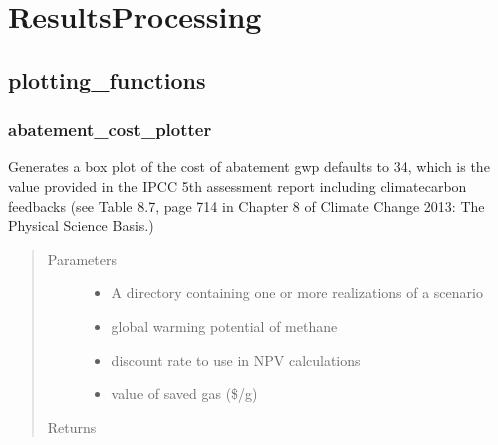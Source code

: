 \documentclass[letterpaper,10pt,english]{sphinxmanual}
\begin{document}
\section{ResultsProcessing}
\label{\detokenize{index:resultsprocessing}}

\subsection{plotting\_functions}
\label{\detokenize{index:module-feast.ResultsProcessing.plotting_functions}}\label{\detokenize{index:plotting-functions}}

\subsubsection{abatement\_cost\_plotter}
\label{\detokenize{index:abatement-cost-plotter}}

\begin{fulllineitems}
\label{\detokenize{index:feast.ResultsProcessing.plotting_functions.abatement_cost_plotter}}
Generates a box plot of the cost of abatement
gwp defaults to 34, which is the value provided in the IPCC 5th assessment report including climate\sphinxhyphen{}carbon feedbacks
(see Table 8.7, page 714 in Chapter 8 of Climate Change 2013: The Physical Science Basis.)
\begin{quote}\begin{description}
\item[{Parameters}] \leavevmode\begin{itemize}
\item {} 
 \textendash{} A directory containing one or more realizations of a scenario

\item {} 
 \textendash{} global warming potential of methane

\item {} 
 \textendash{} discount rate to use in NPV calculations

\item {} 
 \textendash{} value of saved gas (\$/g)

\end{itemize}

\item[{Returns}] \leavevmode


\end{description}\end{quote}

\end{fulllineitems}
\end{document}

